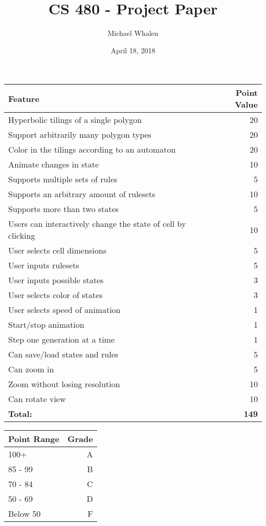 \documentclass[letterpaper,12pt]{article}
\begin{document}
\title{CS 480 - Project Paper}
\author{Michael Whalen}
\date{April 18, 2018}
\maketitle


\begin{center}
  \begin{tabular}{ | l | r | }
    \hline
    \textbf{Feature} & \textbf{Point Value} \\ \hline
    Hyperbolic tilings of a single polygon & 20 \\ \hline
    Support arbitrarily many polygon types & 20 \\ \hline
    Color in the tilings according to an automaton & 20 \\ \hline
    Animate changes in state & 10 \\ \hline
    Supports multiple sets of rules & 5 \\ \hline
	Supports an arbitrary amount of rulesets & 10 \\ \hline
	Supports more than two states & 5 \\ \hline
	Users can interactively change the state of cell by clicking & 10 \\ \hline
	User selects cell dimensions & 5 \\ \hline
	User inputs rulesets & 5 \\ \hline
	User inputs possible states & 3 \\ \hline
	User selects color of states & 3 \\ \hline
	User selects speed of animation & 1 \\ \hline
	Start/stop animation & 1 \\ \hline
	Step one generation at a time & 1 \\ \hline
	Can save/load states and rules & 5 \\ \hline
	Can zoom in & 5 \\ \hline
	Zoom without losing resolution & 10 \\ \hline
	Can rotate view & 10 \\ \hline
	\textbf{Total:} & \textbf{149} \\ \hline

  \end{tabular}
\end{center}

\begin{center}
  \begin{tabular}{ | l | r | }
    \hline
    \textbf{Point Range} & \textbf{Grade} \\ \hline
    100+ & A \\ \hline
    85 - 99 & B \\ \hline
    70 - 84 & C \\ \hline
    50 - 69 & D \\ \hline
    Below 50 & F \\ \hline

  \end{tabular}
\end{center}
\end{document}
